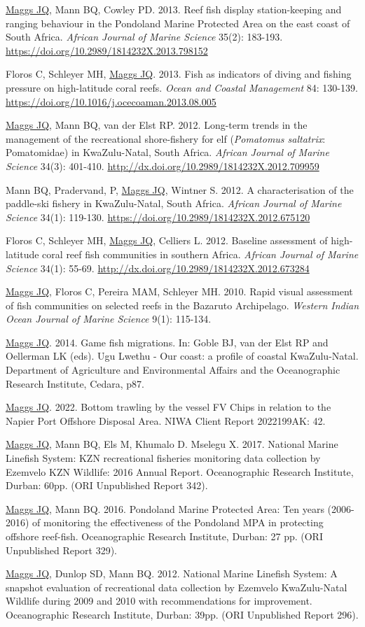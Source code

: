 \documentclass[10pt,a4paper]{article}
\begin{document}
\begin{hangparas}{1.5em}{1}
\underline{Maggs JQ}, Mann BQ, Cowley PD. 2013. Reef fish display station-keeping and ranging behaviour in the Pondoland Marine Protected Area on the east coast of South Africa. \textit{African Journal of Marine Science} 35(2): 183-193. \url{https://doi.org/10.2989/1814232X.2013.798152}

Floros C, Schleyer MH, \underline{Maggs JQ}. 2013. Fish as indicators of diving and fishing pressure on high-latitude coral reefs. \textit{Ocean and Coastal Management} 84: 130-139. \url{https://doi.org/10.1016/j.ocecoaman.2013.08.005}

\underline{Maggs JQ}, Mann BQ, van der Elst RP. 2012. Long-term trends in the management of the recreational shore-fishery for elf (\textit{Pomatomus saltatrix}: Pomatomidae) in KwaZulu-Natal, South Africa. \textit{African Journal of Marine Science} 34(3): 401-410. \url{http://dx.doi.org/10.2989/1814232X.2012.709959}

Mann BQ, Pradervand, P, \underline{Maggs JQ}, Wintner S. 2012. A characterisation of the paddle-ski fishery in KwaZulu-Natal, South Africa. \textit{African Journal of Marine Science} 34(1): 119-130. \url{https://doi.org/10.2989/1814232X.2012.675120}

Floros C, Schleyer MH, \underline{Maggs JQ}, Celliers L. 2012. Baseline assessment of high-latitude coral reef fish communities in southern Africa. \textit{African Journal of Marine Science} 34(1): 55-69. \url{http://dx.doi.org/10.2989/1814232X.2012.673284}

\underline{Maggs JQ}, Floros C, Pereira MAM, Schleyer MH. 2010. Rapid visual assessment of fish communities on selected reefs in the Bazaruto Archipelago. \textit{Western Indian Ocean Journal of Marine Science} 9(1): 115-134.\

\underline{Maggs JQ}. 2014. Game fish migrations. In: Goble BJ, van der Elst RP and Oellerman LK (eds). Ugu Lwethu - Our coast: a profile of coastal KwaZulu-Natal. Department of Agriculture and Environmental Affairs and the Oceanographic Research Institute, Cedara, p87.

\underline{Maggs JQ}. 2022. Bottom trawling by the vessel FV Chips in relation to the Napier Port Offshore Disposal Area. NIWA Client Report 2022199AK: 42.

\underline{Maggs JQ}, Mann BQ, Els M, Khumalo D. Mselegu X. 2017. National Marine Linefish System: KZN recreational fisheries monitoring data collection by Ezemvelo KZN Wildlife: 2016 Annual Report. Oceanographic Research Institute, Durban: 60pp. (ORI Unpublished Report 342).

\underline{Maggs JQ},  Mann BQ. 2016. Pondoland Marine Protected Area: Ten years (2006-2016) of monitoring the effectiveness of the Pondoland MPA in protecting offshore reef-fish. Oceanographic Research Institute, Durban: 27 pp. (ORI Unpublished Report 329).

\underline{Maggs JQ}, Dunlop SD, Mann BQ. 2012. National Marine Linefish System: A snapshot evaluation of recreational data collection by Ezemvelo KwaZulu-Natal Wildlife during 2009 and 2010 with recommendations for improvement. Oceanographic Research Institute, Durban: 39pp. (ORI Unpublished Report 296).

\end{hangparas}
\end{document}
